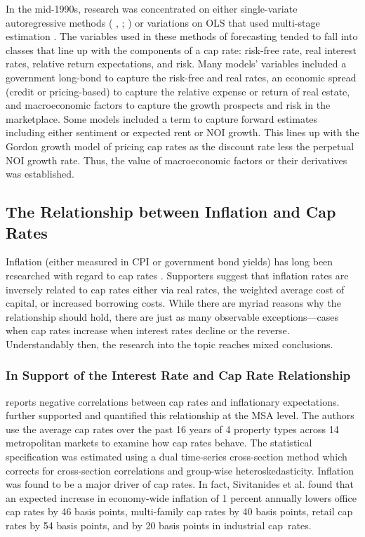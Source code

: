 \documentclass[jrfm,article,accept,oneauthor,pdftex]{Definitions/mdpi}
\begin{document}
In the mid-1990s, research was concentrated on either single-variate autoregressive methods (\citeauthor{gau_1984} \citeyear{gau_1984},  \citeyear{gau_1985}; \citeauthor{linneman_1986} \citeyear{linneman_1986}) or variations on OLS that used multi-stage estimation \citep{case_shiller_1990,abraham_hendershott_1994}. The variables used in these methods of forecasting tended to fall into classes that line up with the components of a cap rate: risk-free rate, real interest rates, relative return expectations, and risk. Many models’ variables included a government long-bond  to capture the risk-free and real rates, an economic spread (credit or pricing-based) to capture the relative expense or return of real estate, and macroeconomic factors to capture the  growth prospects and risk in the marketplace. Some models included a term to capture forward estimates including either sentiment or expected rent or NOI growth. This lines up with the Gordon growth model of pricing cap rates as the discount rate less the perpetual NOI growth rate. Thus, the value of macroeconomic factors or their derivatives was established.

\subsection{The Relationship between Inflation and Cap Rates}

Inflation (either measured in CPI or government bond yields) has long been researched with regard to cap rates \citep*{froland1987determines, sivitanides2001determinants, chandrashekaran2000predictability}. Supporters suggest that inflation rates are inversely related to cap rates either via real rates, the weighted average  cost of capital, or increased borrowing costs. While there are myriad reasons why the relationship should hold, there are just as many observable exceptions---cases when cap rates increase when interest rates decline or the reverse. Understandably then, the research into the topic reaches mixed conclusions. 

\subsubsection{In Support of the Interest Rate and Cap Rate Relationship}
\cite{froland1987determines} reports negative correlations between cap rates and inflationary expectations. \cite{sivitanides2001determinants} further supported and quantified this relationship at the MSA level. The authors use the average cap rates over the past 16 years of 4 property types across 14 metropolitan markets to examine how cap rates behave. The statistical specification was estimated using a dual time-series cross-section method which corrects for cross-section correlations and group-wise heteroskedasticity. Inflation was found to be a major driver of cap rates. In fact, Sivitanides et al. found that an expected increase in economy-wide inflation of 1 percent annually lowers office cap rates by 46 basis points, multi-family cap rates by 40 basis points, retail cap rates by 54 basis points, and by 20 basis points in industrial cap~rates.
\end{document}
